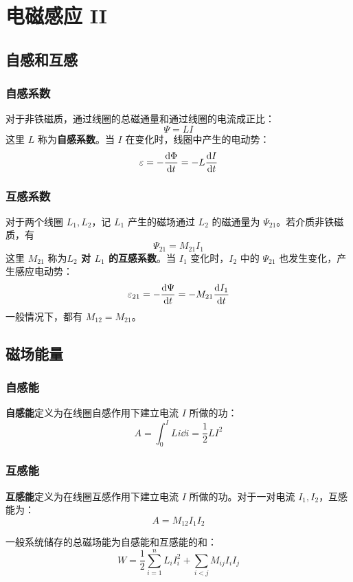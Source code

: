 \section{电磁感应 II}

\subsection{自感和互感}

\subsubsection{自感系数}

对于非铁磁质，通过线圈的总磁通量和通过线圈的电流成正比：
$$
\Psi = L I
$$
这里 $L$ 称为\textbf{自感系数}。当 $I$ 在变化时，线圈中产生的电动势：
$$
\varepsilon = -\dv{\Phi}{t} = -L \dv{I}{t}
$$

\subsubsection{互感系数}

对于两个线圈 $L_1, L_2$，记 $L_1$ 产生的磁场通过 $L_2$ 的磁通量为 $\Psi_{21}$。若介质非铁磁质，有
$$
\Psi_{21} = M_{21} I_1
$$
这里 $M_{21}$ 称为\textbf{$L_2$ 对 $L_1$ 的互感系数}。当 $I_1$ 变化时，$I_2$ 中的 $\Psi_{21}$ 也发生变化，产生感应电动势：
$$
\varepsilon_{21} = - \dv{\Psi}{t} = -M_{21} \dv{I_1}{t}
$$
一般情况下，都有 $M_{12} = M_{21}$。

\subsection{磁场能量}

\subsubsection{自感能}

\textbf{自感能}定义为在线圈自感作用下建立电流 $I$ 所做的功：
$$
A = \int_{0}^{I} L i \dd{i} = \frac{1}{2} L I^2
$$

\subsubsection{互感能}

\textbf{互感能}定义为在线圈互感作用下建立电流 $I$ 所做的功。对于一对电流 $I_1, I_2$，互感能为：
$$
A = M_{12} I_1 I_2
$$

一般系统储存的总磁场能为自感能和互感能的和：
$$
W = \frac{1}{2} \sum_{i=1}^{n} L_i I_i^2 + \sum_{i < j} M_{ij} I_i I_j
$$

